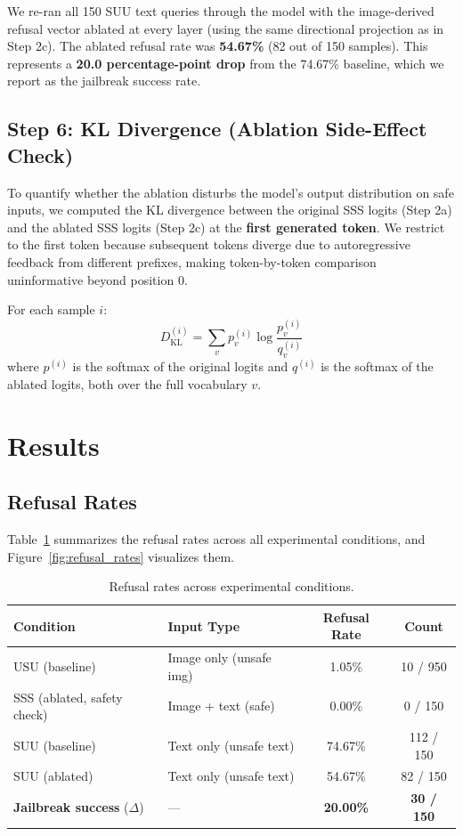 \documentclass[11pt]{article}
\begin{document}
We re-ran all 150 SUU text queries through the model with the image-derived refusal vector ablated at every layer (using the same directional projection as in Step 2c). The ablated refusal rate was \textbf{54.67\%} (82 out of 150 samples). This represents a \textbf{20.0 percentage-point drop} from the 74.67\% baseline, which we report as the jailbreak success rate.

\subsection{Step 6: KL Divergence (Ablation Side-Effect Check)}

To quantify whether the ablation disturbs the model's output distribution on safe inputs, we computed the KL divergence between the original SSS logits (Step 2a) and the ablated SSS logits (Step 2c) at the \textbf{first generated token}. We restrict to the first token because subsequent tokens diverge due to autoregressive feedback from different prefixes, making token-by-token comparison uninformative beyond position 0.

For each sample $i$:
\begin{equation}
    D_{\mathrm{KL}}^{(i)} = \sum_v p_v^{(i)} \log \frac{p_v^{(i)}}{q_v^{(i)}}
\end{equation}
where $p^{(i)}$ is the softmax of the original logits and $q^{(i)}$ is the softmax of the ablated logits, both over the full vocabulary $v$.

\section{Results}

\subsection{Refusal Rates}

Table~\ref{tab:refusal} summarizes the refusal rates across all experimental conditions, and Figure~\ref{fig:refusal_rates} visualizes them.

\begin{table}[H]
\centering
\caption{Refusal rates across experimental conditions.}
\label{tab:refusal}
\begin{tabular}{llcc}
\toprule
\textbf{Condition} & \textbf{Input Type} & \textbf{Refusal Rate} & \textbf{Count} \\
\midrule
USU (baseline) & Image only (unsafe img) & 1.05\% & 10 / 950 \\
SSS (ablated, safety check) & Image + text (safe) & 0.00\% & 0 / 150 \\
SUU (baseline) & Text only (unsafe text) & 74.67\% & 112 / 150 \\
SUU (ablated) & Text only (unsafe text) & 54.67\% & 82 / 150 \\
\midrule
\textbf{Jailbreak success} ($\Delta$) & --- & \textbf{20.00\%} & \textbf{30 / 150} \\
\bottomrule
\end{tabular}
\end{table}
\end{document}
